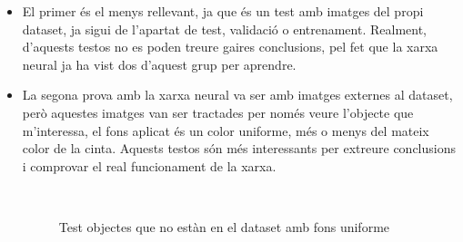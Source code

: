 ﻿\documentclass[10pt,a4paper,twocolumn,twoside]{article}
\begin{document}
\begin{itemize}
 	\item El primer és el menys rellevant, ja que és un test amb imatges del propi dataset, ja sigui de l'apartat de test, validació o entrenament. Realment, d'aquests testos no es poden treure gaires conclusions, pel fet que la xarxa neural ja ha vist dos d'aquest grup per aprendre.

	\item La segona prova amb la xarxa neural va ser amb imatges externes al dataset, però aquestes imatges van ser tractades per només veure l'objecte que m'interessa, el fons aplicat és un color uniforme, més o menys del mateix color de la cinta. Aquests testos són més interessants per extreure conclusions i comprovar el real funcionament de la xarxa.
\begin{figure}[!h]
 \centering
\\
 \caption{Test objectes que no estàn en el dataset amb fons uniforme}
 \label{f:tx60}
\end{figure}


\end{itemize}
\end{document}
